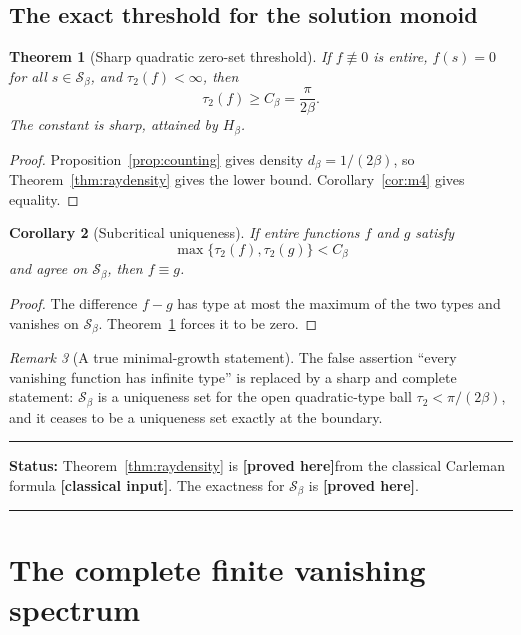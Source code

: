\documentclass[11pt,oneside]{article}
\newtheorem{theorem}{Theorem}[section]
\newtheorem{corollary}[theorem]{Corollary}
\theoremstyle{definition}
\theoremstyle{remark}
\newtheorem{remark}[theorem]{Remark}
\newcommand{\Sbeta}{\mathcal S_\beta}
\newcommand{\Cbeta}{C_\beta}
\newcommand{\statusproved}{\textcolor{provedgreen}{\textbf{[proved here]}}}
\newcommand{\statusclassical}{\textcolor{classicalblue}{\textbf{[classical input]}}}
\newenvironment{statusbox}[1]
{\begin{center}\begin{minipage}{0.94\textwidth}\raggedright\hrule\vspace{0.45em}\textbf{Status:} #1\par\vspace{0.35em}}
{\vspace{0.35em}\hrule\end{minipage}\end{center}}
\begin{document}
\subsection{The exact threshold for the solution monoid}

\begin{theorem}[Sharp quadratic zero-set threshold]
\label{thm:sharpthreshold}
If $f\not\equiv0$ is entire, $f(s)=0$ for all $s\in\Sbeta$, and
$\tau_2(f)<\infty$, then
\begin{equation}
 \tau_2(f)\ge\Cbeta=\frac{\pi}{2\beta}.
 \label{eq:sharpthreshold}
\end{equation}
The constant is sharp, attained by $H_\beta$.
\end{theorem}

\begin{proof}
Proposition~\ref{prop:counting} gives density $d_\beta=1/(2\beta)$, so
Theorem~\ref{thm:raydensity} gives the lower bound.  Corollary~\ref{cor:m4} gives equality.
\end{proof}

\begin{corollary}[Subcritical uniqueness]
\label{cor:uniqueness}
If entire functions $f$ and $g$ satisfy
\[
 \max\{\tau_2(f),\tau_2(g)\}<\Cbeta
\]
and agree on $\Sbeta$, then $f\equiv g$.
\end{corollary}

\begin{proof}
The difference $f-g$ has type at most the maximum of the two types and vanishes on
$\Sbeta$.  Theorem~\ref{thm:sharpthreshold} forces it to be zero.
\end{proof}

\begin{remark}[A true minimal-growth statement]
The false assertion ``every vanishing function has infinite type'' is replaced by a sharp
and complete statement: $\Sbeta$ is a uniqueness set for the open quadratic-type ball
$\tau_2<\pi/(2\beta)$, and it ceases to be a uniqueness set exactly at the boundary.
\end{remark}

\begin{statusbox}{Theorem~\ref{thm:raydensity} is \statusproved from the classical
Carleman formula \statusclassical.  The exactness for $\Sbeta$ is \statusproved.}
\end{statusbox}

\section{The complete finite vanishing spectrum}
\label{sec:vanishingspectrum}
\end{document}
